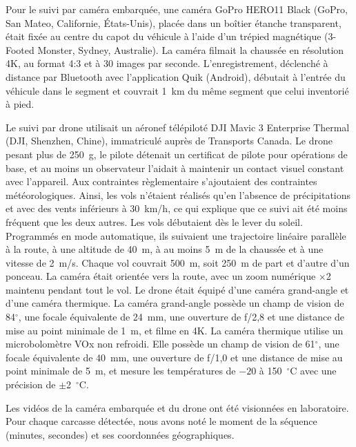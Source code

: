 \shorthandoff{:}
Pour le suivi par caméra embarquée, une caméra GoPro HERO11 Black (GoPro, San Mateo, Californie, États-Unis), placée dans un boîtier étanche transparent, était fixée au centre du capot du véhicule à l'aide d'un trépied magnétique (3-Footed Monster, Sydney, Australie). La caméra filmait la chaussée en résolution 4K, au format 4:3 et à 30 images par seconde. L'enregistrement, déclenché à distance par Bluetooth avec l'application Quik (Android), débutait à l'entrée du véhicule dans le segment et couvrait 1~km du même segment que celui inventorié à pied.
\shorthandon{:}

Le suivi par drone utilisait un aéronef télépiloté DJI Mavic 3 Enterprise Thermal (DJI, Shenzhen, Chine), immatriculé auprès de Transports Canada. Le drone pesant plus de 250~g, le pilote détenait un certificat de pilote pour opérations de base, et au moins un observateur l'aidait à maintenir un contact visuel constant avec l'appareil. Aux contraintes règlementaire s'ajoutaient des contraintes météorologiques. Ainsi, les vols n'étaient réalisés qu'en l'absence de précipitations et avec des vents inférieurs à 30~km/h, ce qui explique que ce suivi ait été moins fréquent que les deux autres. Les vols débutaient dès le lever du soleil. Programmés en mode automatique, ils suivaient une trajectoire linéaire parallèle à la route, à une altitude de 40~m, à au moins 5~m de la chaussée et à une vitesse de 2~m/s. Chaque vol couvrait 500~m, soit 250~m de part et d'autre d'un ponceau. La caméra était orientée vers la route, avec un zoom numérique $\times$2 maintenu pendant tout le vol. Le drone était équipé d'une caméra grand-angle et d'une caméra thermique. La caméra grand-angle possède un champ de vision de 84$^{\circ}$, une focale équivalente de 24~mm, une ouverture de f/2,8 et une distance de mise au point minimale de 1~m, et filme en 4K. La caméra thermique utilise un microbolomètre VOx non refroidi. Elle possède un champ de vision de 61$^{\circ}$, une focale équivalente de 40~mm, une ouverture de f/1,0 et une distance de mise au point minimale de 5~m, et mesure les températures de $-20$ à 150~$^{\circ}$C avec une précision de $\pm$2~$^{\circ}$C.

Les vidéos de la caméra embarquée et du drone ont été visionnées en laboratoire. Pour chaque carcasse détectée, nous avons noté le moment de la séquence (minutes, secondes) et ses coordonnées géographiques.


